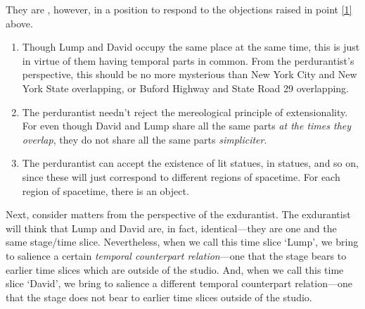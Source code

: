\documentclass[landscape, two column, full page,reqno]{article}
\newcommand{\qe}{\begin{enumerate}[align=left,style=nextline,leftmargin=17pt,labelsep=5pt,font=\normalfont]}
\newcommand{\e}{\emph}
\newcommand{\ze}{\end{enumerate}}
\newcommand{\p}{\item}
\begin{document}
			They are , however, in a position to respond to the objections raised in point \ref{1} above.
				\qe
				\p Though Lump and David occupy the same place at the same time, this is just in virtue of them having temporal parts in common.  From the perdurantist's perspective, this should be no more mysterious than New York City and New York State overlapping, or Buford Highway and State Road 29 overlapping.
				\p The perdurantist needn't reject the mereological principle of extensionality.  For even though David and Lump share all the same parts \e{at the times they overlap}, they do not share all the same parts \e{simpliciter}. 
				\p The perdurantist can accept the existence of lit statues, in statues, and so on, since these will just correspond to different regions of spacetime.  For each region of spacetime, there is an object.
				\ze 
			\p Next, consider matters from the perspective of the exdurantist.  The exdurantist will think that Lump and David are, in fact, identical---they are one and the same stage/time slice.  Nevertheless, when we call this time slice `Lump', we bring to salience a certain \e{temporal counterpart relation}---one that the stage bears to earlier time slices which are outside of the studio.  And, when we call this time slice `David', we bring to salience a different temporal counterpart relation---one that the stage does not bear to earlier time slices outside of the studio.
	
\end{document}
